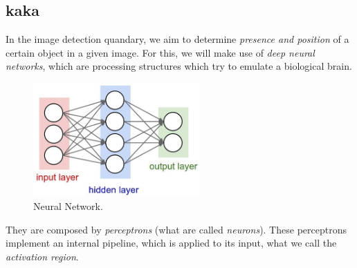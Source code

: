 \subsection{kaka}

In the image detection quandary, we aim to determine \emph{presence and position} of a certain object in a given image. For this, we will make use of \emph{deep neural networks}, which are processing structures which try to emulate a biological brain.\\


\begin{figure}[h]
	\centering
	\includegraphics[width=2.5in]{images/neural_network_2}
	\caption{Neural Network.}
\end{figure}


They are composed by \emph{perceptrons} (what are called \emph{neurons}). These perceptrons implement an internal pipeline, which is applied to its input, what we call the \emph{activation region}.


